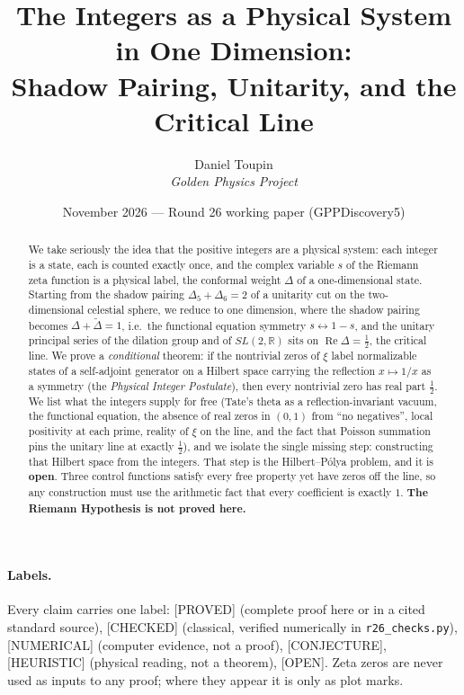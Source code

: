 \documentclass[11pt,a4paper]{article}
\title{The Integers as a Physical System in One Dimension:\\[4pt]
Shadow Pairing, Unitarity, and the Critical Line}
\author{Daniel Toupin\\[2pt]\textit{Golden Physics Project}}
\date{November 2026 --- Round 26 working paper (GPPDiscovery5)}
\theoremstyle{plain}
\theoremstyle{definition}
\theoremstyle{remark}
\newcommand{\R}{\mathbb{R}}
\newcommand{\lab}[1]{\textsf{\small[#1]}}
\newcommand{\PROVED}{\lab{PROVED}}
\newcommand{\CHECKED}{\lab{CHECKED}}
\newcommand{\NUMERICAL}{\lab{NUMERICAL}}
\newcommand{\CONJ}{\lab{CONJECTURE}}
\newcommand{\HEUR}{\lab{HEURISTIC}}
\newcommand{\OPEN}{\lab{OPEN}}
\renewcommand{\Re}{\operatorname{Re}}
\begin{document}
\maketitle

\begin{abstract}
\noindent
We take seriously the idea that the positive integers are a physical
system: each integer is a state, each is counted exactly once, and the
complex variable $s$ of the Riemann zeta function is a physical label, the
conformal weight $\Delta$ of a one-dimensional state. Starting from the
shadow pairing $\Delta_5+\Delta_6=2$ of a unitarity cut on the
two-dimensional celestial sphere, we reduce to one dimension, where the
shadow pairing becomes $\Delta+\tilde\Delta=1$, i.e.\ the functional
equation symmetry $s\leftrightarrow 1-s$, and the unitary principal series
of the dilation group and of $SL(2,\R)$ sits on $\Re\Delta=\tfrac12$, the
critical line. We prove a \emph{conditional} theorem: if the nontrivial
zeros of $\xi$ label normalizable states of a self-adjoint generator on a
Hilbert space carrying the reflection $x\mapsto 1/x$ as a symmetry
(the \emph{Physical Integer Postulate}), then every nontrivial zero has real
part $\tfrac12$. We list what the integers supply for free (Tate's theta
as a reflection-invariant vacuum, the functional equation, the absence of
real zeros in $(0,1)$ from ``no negatives'', local positivity at each
prime, reality of $\xi$ on the line, and the fact that Poisson summation
pins the unitary line at exactly $\tfrac12$), and we isolate the single
missing step: constructing that Hilbert space from the integers. That step is
the Hilbert--P\'olya problem, and it is \textbf{open}. Three control
functions satisfy every free property yet have zeros off the line, so any
construction must use the arithmetic fact that every coefficient is exactly
$1$. \textbf{The Riemann Hypothesis is not proved here.}
\end{abstract}

\paragraph{Labels.} Every claim carries one label:
\PROVED{} (complete proof here or in a cited standard source),
\CHECKED{} (classical, verified numerically in \texttt{r26\_checks.py}),
\NUMERICAL{} (computer evidence, not a proof),
\CONJ{}, \HEUR{} (physical reading, not a theorem), \OPEN.
Zeta zeros are never used as inputs to any proof; where they appear it is only
as plot marks.
\end{document}

